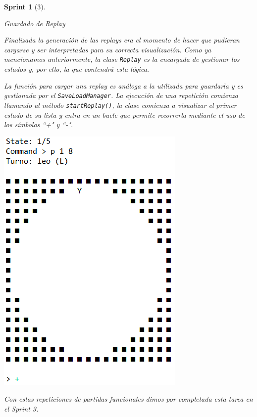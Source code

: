 \documentclass[12pt,a4paper,openright]{book}
\theoremstyle{break}
\newtheorem*{sprint}{Sprint}
\begin{document}
\begin{sprint}[3]
\begin{center}
Guardado de Replay
\end{center}

Finalizada la generación de las \textit{replays} era el momento de hacer que pudieran cargarse y ser interpretadas para su correcta visualización. Como ya mencionamos anteriormente, la clase \texttt{Replay} es la encargada de gestionar los estados y, por ello, la que contendrá esta lógica.

La función para cargar una \textit{replay} es análoga a la utilizada para guardarla y es gestionada por el \texttt{SaveLoadManager}. La ejecución de una repetición comienza llamando al método \texttt{startReplay()}, la clase comienza a visualizar el primer estado de su lista y entra en un bucle que permite recorrerla mediante el uso de los símbolos ``+" y ``-".

\begin{center}
\includegraphics[scale=0.7]{consola-replay-sprint-3.png}
\end{center}

Con estas repeticiones de partidas funcionales dimos por completada esta tarea en el Sprint 3.
\end{sprint}
\end{document}
